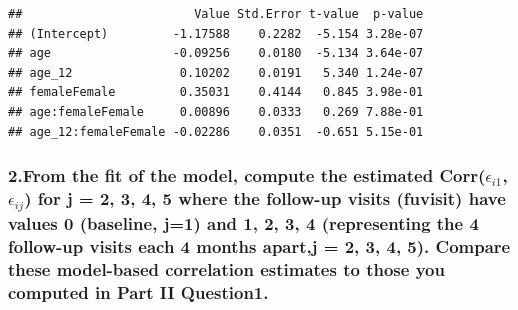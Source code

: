 \documentclass[
]{article}
\newenvironment{Shaded}{\begin{snugshade}}{\end{snugshade}}
\newcommand{\CommentTok}[1]{\textcolor[rgb]{0.56,0.35,0.01}{\textit{#1}}}
\begin{document}
\begin{verbatim}
##                        Value Std.Error t-value  p-value
## (Intercept)         -1.17588    0.2282  -5.154 3.28e-07
## age                 -0.09256    0.0180  -5.134 3.64e-07
## age_12               0.10202    0.0191   5.340 1.24e-07
## femaleFemale         0.35031    0.4144   0.845 3.98e-01
## age:femaleFemale     0.00896    0.0333   0.269 7.88e-01
## age_12:femaleFemale -0.02286    0.0351  -0.651 5.15e-01
\end{verbatim}

\begin{Shaded}
\end{Shaded}

\hypertarget{from-the-fit-of-the-model-compute-the-estimated-correpsilon_i1-epsilon_ij-for-j-2-3-4-5-where-the-follow-up-visits-fuvisit-have-values-0-baseline-j1-and-1-2-3-4-representing-the-4-follow-up-visits-each-4-months-apartj-2-3-4-5.-compare-these-model-based-correlation-estimates-to-those-you-computed-in-part-ii-question1.}{%
\subsubsection{\texorpdfstring{2.From the fit of the model, compute the
estimated Corr(\(\epsilon_{i1}\), \(\epsilon_{ij}\)) for j = 2, 3, 4, 5
where the follow-up visits (fuvisit) have values 0 (baseline, j=1) and
1, 2, 3, 4 (representing the 4 follow-up visits each 4 months apart,j =
2, 3, 4, 5). Compare these model-based correlation estimates to those
you computed in Part II
Question1.}{2.From the fit of the model, compute the estimated Corr(\textbackslash epsilon\_\{i1\}, \textbackslash epsilon\_\{ij\}) for j = 2, 3, 4, 5 where the follow-up visits (fuvisit) have values 0 (baseline, j=1) and 1, 2, 3, 4 (representing the 4 follow-up visits each 4 months apart,j = 2, 3, 4, 5). Compare these model-based correlation estimates to those you computed in Part II Question1.}}\label{from-the-fit-of-the-model-compute-the-estimated-correpsilon_i1-epsilon_ij-for-j-2-3-4-5-where-the-follow-up-visits-fuvisit-have-values-0-baseline-j1-and-1-2-3-4-representing-the-4-follow-up-visits-each-4-months-apartj-2-3-4-5.-compare-these-model-based-correlation-estimates-to-those-you-computed-in-part-ii-question1.}}
\end{document}
